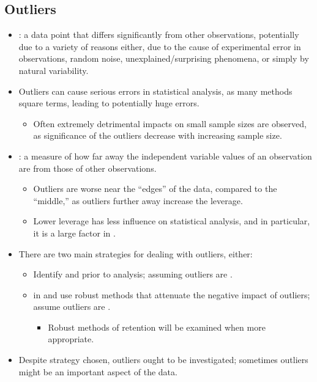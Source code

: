 \begin{itemize}
\subsection{Outliers}
\begin{itemize}
  \item {}: a data point that differs significantly from other observations, potentially due to a variety of reasons either, due to the cause of experimental error in observations, random noise, unexplained/surprising phenomena, or simply by natural variability.
  \item Outliers can cause serious errors in statistical analysis, as many methods square terms, leading to potentially huge errors. 
    \begin{itemize}
      \item Often extremely detrimental impacts on small sample sizes are observed, as significance of the outliers decrease with increasing sample size.
    \end{itemize}
  \item {}: a measure of how far away the independent variable values of an observation are from those of other observations.
    \begin{itemize}
      \item Outliers are worse near the ``edges'' of the data, compared to the ``middle,'' as outliers further away increase the leverage.
      \item Lower leverage has less influence on statistical analysis, and in particular, it is a large factor in \hyperref[Chapter: Regression]{}.
    \end{itemize}
  \item There are two main strategies for dealing with outliers, either:
    \begin{itemize}
      \item Identify and  prior to analysis; assuming outliers are .
      \item {} in and use robust methods that attenuate the negative impact of outliers; assume outliers are .
        \begin{itemize}
          \item Robust methods of retention will be examined when more appropriate.
        \end{itemize}
    \end{itemize}
  \item Despite strategy chosen, outliers ought to be investigated; sometimes outliers might be an important aspect of the data.
\end{itemize}


\end{itemize}

